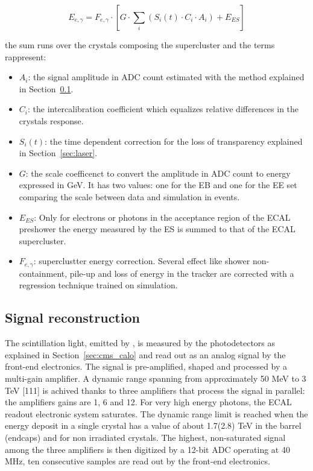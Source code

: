 \begin{equation}
  E_{e,\gamma} = F_{e,\gamma} \cdot \left[ G \cdot \sum_{i} ( S_i(t)\cdot C_i \cdot A_i ) + E_{ES} \right]
\end{equation}

the sum runs over the crystals composing the supercluster and the terms rappresent:

\begin{itemize}
\item $A_i$: the signal amplitude in ADC count estimated with the method explained in Section~\ref{sec:signal_reco}.
\item $C_i$: the intercalibration coefficient which equalizes relative differences in the crystals response.
\item $S_i(t)$: the time dependent correction for the loss of transparency explained in Section~\ref{sec:laser}.
\item $G$: the scale coefficenct to convert the amplitude in ADC count to energy expressed in GeV. It has two values:
  one for the EB and one for the EE set comparing the scale between data and simulation in \Zee events.
\item $E_{ES}$: Only for electrons or photons in the acceptance region of the ECAL preshower the energy measured
  by the ES is summed to that of the ECAL supercluster.
\item $F_{e,\gamma}$: superclustter energy correction. Several effect like shower non-containment, pile-up and
  loss of energy in the tracker are corrected with a regression technique trained on simulation.
\end{itemize}

\subsection{Signal reconstruction}
\label{sec:signal_reco}
The scintillation light, emitted by \PbWO , is measured by the photodetectors as explained in
Section~\ref{sec:cms_calo} and read
out as an analog signal by the front-end electronics. The signal is pre-amplified, shaped
and processed by a multi-gain amplifier. A dynamic range spanning from
approximately 50 MeV to 3 TeV [111] is achived thanks to three
amplifiers that process the signal in parallel: the amplifiers gains are 1, 6 and 12.
For very high energy photons, the ECAL readout electronic system saturates.
The dynamic range limit is reached when the energy
deposit in a single crystal has a value of about 1.7(2.8) TeV in the barrel (endcaps) and for
non irradiated crystals. The highest, non-saturated signal among the three amplifiers is then digitized by a 12-bit
ADC operating at 40 MHz, ten consecutive samples are read out by the front-end electronics.


